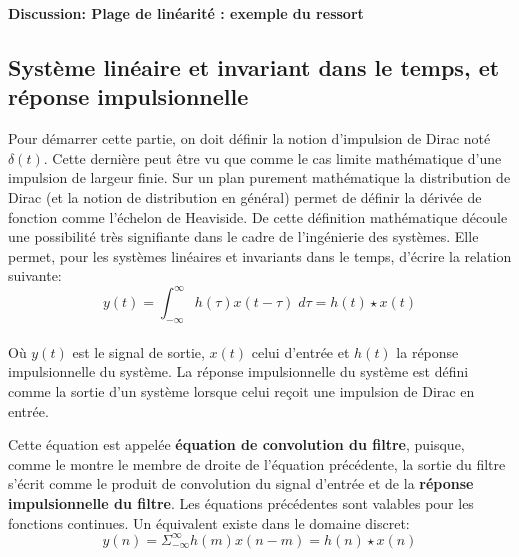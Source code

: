 \documentclass[11pt,a4paper]{article}
\begin{document}
\textbf{Discussion: Plage de linéarité : exemple du ressort}

\subsection{Système linéaire et invariant dans le temps, et réponse impulsionnelle}
Pour démarrer cette partie, on doit définir la notion d'impulsion de Dirac noté $\delta(t)$. Cette dernière peut être vu que comme le cas limite mathématique d'une impulsion de largeur finie. Sur un plan purement mathématique la distribution de Dirac (et la notion de distribution en général) permet de définir la dérivée de fonction comme l'échelon de Heaviside.  De cette définition mathématique découle une possibilité très signifiante dans le cadre de l'ingénierie des systèmes. Elle permet, pour les systèmes linéaires  et invariants dans le temps, d'écrire la relation suivante:\\  
 
\[y(t) = \int^{\infty}_{-\infty} h(\tau) x(t-\tau) \; d\tau = h(t) \star x(t)\] \\

Où $y(t)$ est le signal de sortie, $x(t)$ celui d'entrée et $h(t)$ la réponse impulsionnelle du système. La réponse impulsionnelle du système est défini comme la sortie d'un système lorsque celui reçoit une impulsion de Dirac en entrée.

\begin{center}
\end{center}

Cette équation est appelée \textbf{équation de convolution du filtre}, puisque, comme le montre le membre de droite de l'équation précédente, la sortie du filtre s'écrit comme le produit de convolution du signal d'entrée et de la \textbf{réponse impulsionnelle du filtre}. Les équations précédentes sont valables pour les fonctions continues. Un équivalent existe dans le domaine discret: \\

\[y(n) = \Sigma^{\infty}_{-\infty} h(m) x(n-m) = h(n) \star x(n)\]\\
\end{document}
